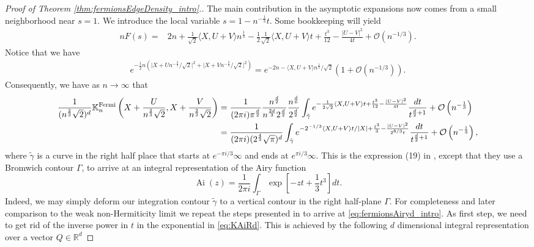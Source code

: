 \documentclass[%
 jmp,
cp,  %
 amsmath,amsthm,amssymb,%
 reprint,%
onecolumn]{revtex4-2}
\begin{document}
\begin{proof}[Proof of Theorem \ref{thm:fermionsEdgeDensity_intro}.]
The main contribution in the asymptotic expansions now comes from a small neighborhood near $s=1$. We introduce the local variable $s = 1- n^{-\frac{1}{3}} t $. 
Some bookkeeping will yield 
\begin{align*}
n F(s) =& 2 n + \frac{1}{\sqrt 2} \langle X,U+V\rangle n^{\frac{1}{3}} - \frac{1}{2} \frac{1}{\sqrt 2} \langle X,U+V\rangle t + \frac{t^3}{12} - \frac{\lvert U-V\rvert^2}{4 t} +  \mathcal O(n^{-1/3}).
\end{align*}
Notice that we have
\begin{align*}
e^{-\frac{1}{2}n\left(\lvert X+U n^{-\frac{2}{3}}/\sqrt 2 \rvert^2+\lvert X+V n^{-\frac{2}{3}}/\sqrt 2 \rvert^2\right)} 
= e^{-2n - \langle X,U+V\rangle n^{\frac{1}{3}}/\sqrt 2} (1+\mathcal O(n^{-1/3})).
\end{align*}
Consequently, we have as $n\to\infty$ that
\begin{align}
\frac{1}{(n^\frac{2}{3} \sqrt 2)^d}{\mathbb K}^{\rm Fermi}_n\left(X+\frac{U}{n^\frac{2}{3}\sqrt 2}, X + \frac{V}{n^\frac{2}{3}\sqrt 2}\right) 
&=  \frac{1}{(2 \pi i) \pi^\frac{d}{2}}\frac{n^\frac{d}{2}}{n^\frac{2 d}{3} 2^\frac{d}{2}} \frac{n^\frac{d}{6}}{2^\frac{d}{2}} \int_{\tilde\gamma} e^{-\frac{1}{2\sqrt 2} \langle X,U+V\rangle t + \frac{t^3}{12} - \frac{\lvert U-V\rvert^2}{4 t}} \frac{dt}{t^{\frac{d}{2}+1}}+ \mathcal O\left(n^{-\frac{1}{3}}\right)
\nonumber\\
&= \frac{1}{(2\pi i) (2^\frac{4}{3} \sqrt \pi)^d} \int_{\tilde\gamma} e^{-2^{-1/3} \langle X,U+V\rangle t/\lvert X\rvert  + \frac{t^3}{3} - \frac{\lvert U-V\rvert^2}{2^{8/3} t}} \frac{dt}{t^{\frac{d}{2}+1}} + \mathcal O\left(n^{-\frac{1}{3}}\right),
\label{eq:KAiRd}
\end{align}
where $\tilde\gamma$ is a curve in the right half place that starts at $e^{-\pi i/3} \infty$ and ends at $e^{\pi i/3} \infty$. 
This is the expression (19) in \cite{DeDoMaSc}, except that they use a Bromwich contour $\Gamma$, to arrive at an integral representation of the Airy function
\begin{equation}\label{eq:Airy-rep}
\operatorname{Ai}(z)=\frac{1}{2\pi i}\int_{\Gamma}\exp[-z t +\frac13 t^3]dt .
\end{equation}
Indeed, we may simply deform our integration contour $\tilde\gamma$ to a vertical contour in the right half-plane $\Gamma$. 
For completeness and later comparison to the weak non-Hermiticity limit we repeat the steps presented in 
\cite{DeDoMaSc} to arrive at \eqref{eq:fermionsAiryd_intro}. As first step, we need to get rid of the inverse power in $t$ in the exponential in \eqref{eq:KAiRd}. This is achieved by the following $d$ dimensional integral representation over a vector $Q\in\mathbb{R}^d$

\end{proof}
\end{document}
